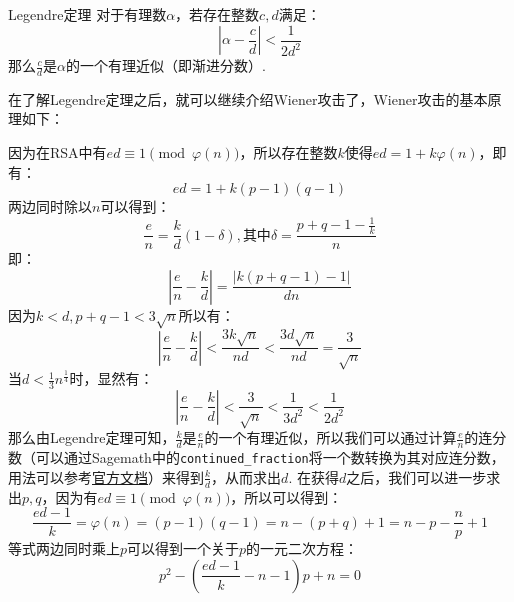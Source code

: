 \documentclass{book}
\numberwithin{equation}{subsubsection}
\begin{document}
\begin{concept}{Legendre定理}
    对于有理数$\alpha$，若存在整数$c,d$满足：
    \begin{equation}
        \left|\alpha-\frac{c}{d}\right|<\frac{1}{2d^2}
        \nonumber
    \end{equation}
    那么$\frac{c}{d}$是$\alpha$的一个有理近似（即渐进分数）.
\end{concept}

在了解Legendre定理之后，就可以继续介绍Wiener攻击了，Wiener攻击的基本原理如下：\par
因为在RSA中有$ed\equiv 1\pmod{\varphi(n)}$，所以存在整数$k$使得$ed=1+k\varphi(n)$，即有：
\begin{equation}
    ed=1+k(p-1)(q-1)
    \nonumber
\end{equation}
两边同时除以$n$可以得到：
\begin{equation}
    \frac{e}{n}=\frac{k}{d}(1-\delta),\text{其中}\delta=\frac{p+q-1-\frac{1}{k}}{n}
    \nonumber
\end{equation}
即：
\begin{equation}
    \left|\frac{e}{n}-\frac{k}{d}\right|=\frac{|k(p+q-1)-1|}{dn}
    \nonumber
\end{equation}
因为$k<d,p+q-1<3\sqrt{n}$所以有：
\begin{equation}
    \left|\frac{e}{n}-\frac{k}{d}\right|<\frac{3k\sqrt{n}}{nd}<\frac{3d\sqrt{n}}{nd}=\frac{3}{\sqrt{n}}
    \nonumber
\end{equation}
当$d<\frac{1}{3}n^{\frac{1}{4}}$时，显然有：
\begin{equation}
    \left|\frac{e}{n}-\frac{k}{d}\right|<\frac{3}{\sqrt{n}}<\frac{1}{3d^2}<\frac{1}{2d^2}
    \nonumber
\end{equation}
那么由Legendre定理可知，$\frac{k}{d}$是$\frac{e}{n}$的一个有理近似，所以我们可以通过计算$\frac{e}{n}$的连分数（可以通过Sagemath中的\texttt{continued\_fraction}将一个数转换为其对应连分数，用法可以参考\href{https://doc.sagemath.org/html/en/reference/diophantine\_approximation/sage/rings/continued\_fraction.html\#sage.rings.continued\_fraction.continued\_fraction}{官方文档}）来得到$\frac{k}{d}$，从而求出$d$.
在获得$d$之后，我们可以进一步求出$p,q$，因为有$ed\equiv 1\pmod{\varphi(n)}$，所以可以得到：
\begin{equation}
    \frac{ed-1}{k}=\varphi(n)=(p-1)(q-1)=n-(p+q)+1=n-p-\frac{n}{p}+1
    \nonumber
\end{equation}
等式两边同时乘上$p$可以得到一个关于$p$的一元二次方程：
\begin{equation}
    p^2-\left(\frac{ed-1}{k}-n-1\right)p+n=0
    \nonumber
\end{equation}
\end{document}
